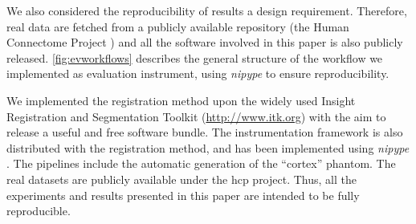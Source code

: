 {\color{red} We also considered the reproducibility of results a design requirement.
Therefore, real data are fetched from a publicly available repository
  (the Human Connectome Project \citep{essen_human_2012}) and all the software
  involved in this paper is also publicly released.
\autoref{fig:evworkflows} describes the general structure of the workflow we implemented
  as evaluation instrument, using \emph{nipype} \citep{gorgolewski_nipype_2011} to ensure
  reproducibility.}

We implemented the registration method upon the widely used Insight Registration and Segmentation
	Toolkit (\url{http://www.itk.org}) with the aim to release a useful and free software bundle.
The instrumentation framework is also distributed with the registration method,
  and has been implemented using \emph{nipype} \citep{gorgolewski_nipype_2011}.
The pipelines include the automatic generation of the ``cortex'' phantom.
The real datasets are publicly available under the \gls*{hcp} project.
Thus, all the experiments and results presented in this paper are intended to be
  fully reproducible.